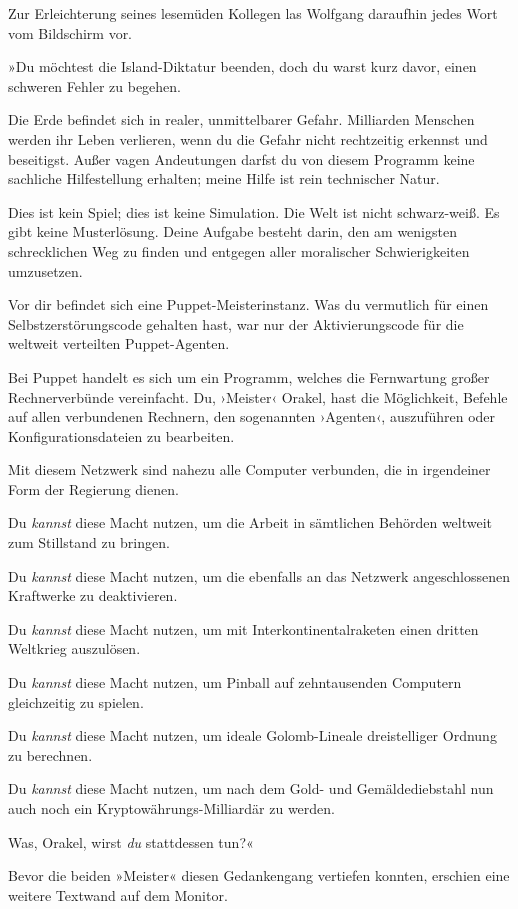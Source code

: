 Zur Erleichterung seines lesemüden Kollegen las Wolfgang daraufhin jedes Wort vom Bildschirm vor.

»Du möchtest die Island-Diktatur beenden, doch du warst kurz davor, einen schweren Fehler zu begehen.

Die Erde befindet sich in realer, unmittelbarer Gefahr. Milliarden Menschen werden ihr Leben verlieren, wenn du die Gefahr nicht rechtzeitig erkennst und beseitigst. Außer vagen Andeutungen darfst du von diesem Programm keine sachliche Hilfestellung erhalten; meine Hilfe ist rein technischer Natur.

Dies ist kein Spiel; dies ist keine Simulation. Die Welt ist nicht schwarz-weiß. Es gibt keine Musterlösung. Deine Aufgabe besteht darin, den am wenigsten schrecklichen Weg zu finden und entgegen aller moralischer Schwierigkeiten umzusetzen.

Vor dir befindet sich eine Puppet-Meisterinstanz. Was du vermutlich für einen Selbstzerstörungscode gehalten hast, war nur der Aktivierungscode für die weltweit verteilten Puppet-Agenten.

Bei Puppet handelt es sich um ein Programm, welches die Fernwartung großer Rechnerverbünde vereinfacht. Du, ›Meister‹ Orakel, hast die Möglichkeit, Befehle auf allen verbundenen Rechnern, den sogenannten ›Agenten‹, auszuführen oder Konfigurationsdateien zu bearbeiten.

Mit diesem Netzwerk sind nahezu alle Computer verbunden, die in irgendeiner Form der Regierung dienen.

Du \emph{kannst} diese Macht nutzen, um die Arbeit in sämtlichen Behörden weltweit zum Stillstand zu bringen.

Du \emph{kannst} diese Macht nutzen, um die ebenfalls an das Netzwerk angeschlossenen Kraftwerke zu deaktivieren.

Du \emph{kannst} diese Macht nutzen, um mit Interkontinentalraketen einen dritten Weltkrieg auszulösen.

Du \emph{kannst} diese Macht nutzen, um Pinball auf zehntausenden Computern gleichzeitig zu spielen.

Du \emph{kannst} diese Macht nutzen, um ideale Golomb-Lineale dreistelliger Ordnung zu berechnen.

Du \emph{kannst} diese Macht nutzen, um nach dem Gold- und Gemäldediebstahl nun auch noch ein Kryptowährungs-Milliardär zu werden.

Was, Orakel, wirst \emph{du} stattdessen tun?«

Bevor die beiden »Meister« diesen Gedankengang vertiefen konnten, erschien eine weitere Textwand auf dem Monitor.


